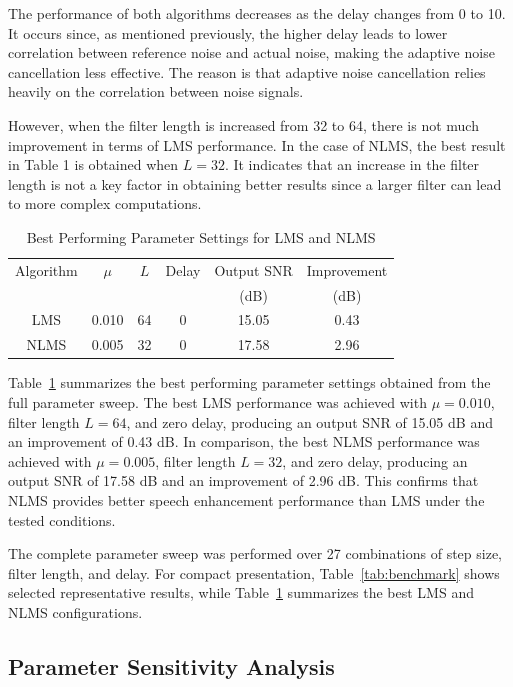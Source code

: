 \documentclass[12pt]{article}
\begin{document}
The performance of both algorithms decreases as the delay changes from 0 to 10. It occurs since, as mentioned previously, the higher delay leads to lower correlation between reference noise and actual noise, making the adaptive noise cancellation less effective. The reason is that adaptive noise cancellation relies heavily on the correlation between noise signals.

However, when the filter length is increased from 32 to 64, there is not much improvement in terms of LMS performance. In the case of NLMS, the best result in Table 1 is obtained when $L = 32$. It indicates that an increase in the filter length is not a key factor in obtaining better results since a larger filter can lead to more complex computations.

\begin{table}[htbp]
\caption{Best Performing Parameter Settings for LMS and NLMS}
\centering
\begin{tabular}{cccccc}
\toprule
Algorithm & $\mu$ & $L$ & Delay & Output SNR & Improvement \\
          &       &     &       & (dB)       & (dB) \\
\midrule
LMS  & 0.010 & 64 & 0 & 15.05 & 0.43 \\
NLMS & 0.005 & 32 & 0 & 17.58 & 2.96 \\
\bottomrule
\end{tabular}
\label{tab:best_params}
\end{table}

Table~\ref{tab:best_params} summarizes the best performing parameter settings obtained from the full parameter sweep. The best LMS performance was achieved with $\mu=0.010$, filter length $L=64$, and zero delay, producing an output SNR of 15.05 dB and an improvement of 0.43 dB. In comparison, the best NLMS performance was achieved with $\mu=0.005$, filter length $L=32$, and zero delay, producing an output SNR of 17.58 dB and an improvement of 2.96 dB. This confirms that NLMS provides better speech enhancement performance than LMS under the tested conditions.

The complete parameter sweep was performed over 27 combinations of step size, filter length, and delay. For compact presentation, Table~\ref{tab:benchmark} shows selected representative results, while Table~\ref{tab:best_params} summarizes the best LMS and NLMS configurations.
\subsection{Parameter Sensitivity Analysis}
\end{document}
